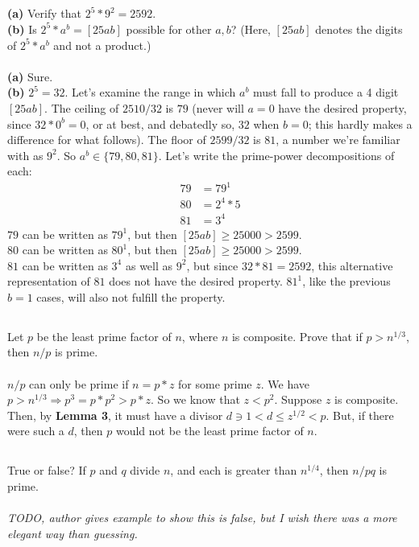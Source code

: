 \documentclass{article}
\begin{document}
\subsection{}
\textbf{(a)} Verify that $2^5*9^2 = 2592$.\\
\textbf{(b)} Is $2^5*a^b = [25ab]$ possible for other $a, b$?
(Here, $[25ab]$ denotes the digits of $2^5*a^b$ and not a product.)\\~\\
\textbf{(a)} Sure.\\
\textbf{(b)} $2^5 = 32$.
Let's examine the range in which $a^b$ must fall to produce a 4 digit $[25ab]$.
The ceiling of $2510 / 32$ is $79$
(never will $a = 0$ have the desired property, since $32 * 0^b = 0$, or at best, and
debatedly so, $32$ when $b = 0$; this hardly makes a difference for what follows).
The floor of $2599 / 32$ is $81$, a number we're familiar with as $9^2$.
So $a^b \in \{79, 80, 81\}$.
Let's write the prime-power decompositions of each:
\begin{align}
    79 &= 79^1 \\
    80 &= 2^4 * 5 \\
    81 &= 3^4
\end{align}
$79$ can be written as $79^1$, but then $[25ab] \geq 25000 > 2599$.\\
$80$ can be written as $80^1$, but then $[25ab] \geq 25000 > 2599$.\\
$81$ can be written as $3^4$ as well as $9^2$, but since $32 * 81 = 2592$,
this alternative representation of $81$ does not have the desired property.
$81^1$, like the previous $b = 1$ cases, will also not fulfill the property.

\subsection{}
Let $p$ be the least prime factor of $n$, where $n$ is composite.
Prove that if $p > n^{1/3}$, then $n/p$ is prime.\\~\\
$n/p$ can only be prime if $n = p * z$ for some prime $z$.
We have $p > n^{1/3} \Rightarrow p^3 = p * p^2 > p * z$.
So we know that $z < p^2$. Suppose $z$ is composite.
Then, by \textbf{Lemma 3}, it must have a divisor $d \ni 1 < d \leq z^{1/2} < p$.
But, if there were such a $d$, then $p$ would not be the least prime factor of $n$.

\subsection{}
True or false? If $p$ and $q$ divide $n$, and each is greater than $n^{1/4}$,
then $n/pq$ is prime.\\~\\
\textit{TODO, author gives example to show this is false, but I wish there was a more
elegant way than guessing.}
\end{document}
